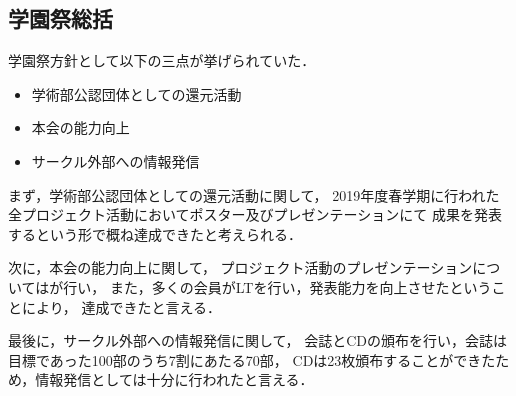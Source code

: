 \subsection*{学園祭総括}

学園祭方針として以下の三点が挙げられていた．

\begin{itemize}
    \item 学術部公認団体としての還元活動
    \item 本会の能力向上
    \item サークル外部への情報発信
\end{itemize}

まず，学術部公認団体としての還元活動に関して，
2019年度春学期に行われた全プロジェクト活動においてポスター及びプレゼンテーションにて
成果を発表するという形で概ね達成できたと考えられる．

次に，本会の能力向上に関して，
プロジェクト活動のプレゼンテーションについては\firstGrade{}が行い，
また，多くの会員がLTを行い，発表能力を向上させたということにより，
達成できたと言える．

最後に，サークル外部への情報発信に関して，
会誌とCDの頒布を行い，会誌は目標であった100部のうち7割にあたる70部，
CDは23枚頒布することができたため，情報発信としては十分に行われたと言える．
